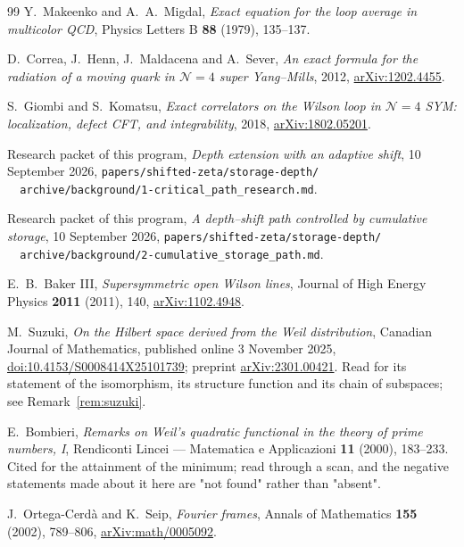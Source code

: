 \begin{thebibliography}{99}
Y.~Makeenko and A.~A.~Migdal, \emph{Exact equation for the loop average in
multicolor QCD}, Physics Letters B \textbf{88} (1979), 135--137.

D.~Correa, J.~Henn, J.~Maldacena and A.~Sever, \emph{An exact formula for the
radiation of a moving quark in $\mathcal N=4$ super Yang--Mills}, 2012,
\href{https://arxiv.org/abs/1202.4455}{arXiv:1202.4455}.

S.~Giombi and S.~Komatsu, \emph{Exact correlators on the Wilson loop in
$\mathcal N=4$ SYM: localization, defect CFT, and integrability}, 2018,
\href{https://arxiv.org/abs/1802.05201}{arXiv:1802.05201}.

Research packet of this program, \emph{Depth extension with an adaptive shift},
10 September 2026,
\texttt{papers/shifted-zeta/storage-depth/}\\
\texttt{\ \ archive/background/1-critical\_path\_research.md}.

Research packet of this program, \emph{A depth--shift path controlled by
cumulative storage}, 10 September 2026,
\texttt{papers/shifted-zeta/storage-depth/}\\
\texttt{\ \ archive/background/2-cumulative\_storage\_path.md}.

E.~B.~Baker III, \emph{Supersymmetric open Wilson lines}, Journal of High Energy
Physics \textbf{2011} (2011), 140,
\href{https://arxiv.org/abs/1102.4948}{arXiv:1102.4948}.

M.~Suzuki, \emph{On the Hilbert space derived from the Weil distribution},
Canadian Journal of Mathematics, published online 3 November 2025,
\href{https://doi.org/10.4153/S0008414X25101739}{doi:10.4153/S0008414X25101739};
preprint \href{https://arxiv.org/abs/2301.00421}{arXiv:2301.00421}. Read for its
statement of the isomorphism, its structure function and its chain of subspaces;
see Remark~\ref{rem:suzuki}.

E.~Bombieri, \emph{Remarks on Weil's quadratic functional in the theory of prime
numbers, I}, Rendiconti Lincei --- Matematica e Applicazioni \textbf{11} (2000),
183--233. Cited for the attainment of the minimum; read through a scan, and the
negative statements made about it here are "not found" rather than "absent".

J.~Ortega-Cerd\`a and K.~Seip, \emph{Fourier frames}, Annals of Mathematics
\textbf{155} (2002), 789--806,
\href{https://arxiv.org/abs/math/0005092}{arXiv:math/0005092}.


\end{thebibliography}
